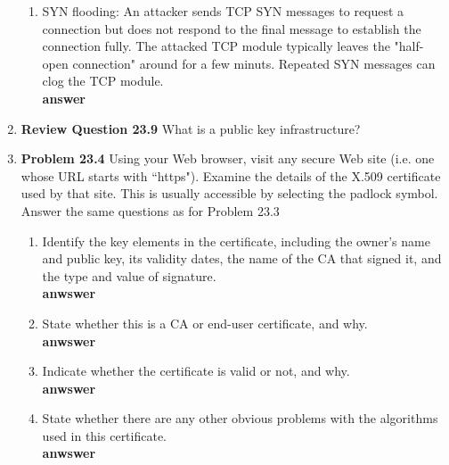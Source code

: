\documentclass[12pt]{article}
\begin{document}
\begin{enumerate}
\begin{enumerate}
    \item SYN flooding: An attacker sends TCP SYN messages to request a connection but does not respond to the final message to establish the connection fully. The attacked TCP module typically leaves the "half-open connection" around for a few minuts. Repeated SYN messages can clog the TCP module.\\

    \textbf{answer} \\

  \end{enumerate}

  \item \textbf{Review Question 23.9} What is a public key infrastructure?\\

  \item \textbf{Problem 23.4} Using your Web browser, visit any secure Web site (i.e. one whose URL starts with ``https"). Examine the details of the X.509 certificate used by that site. This is usually accessible by selecting the padlock symbol. Answer the same questions as for Problem 23.3 \\

  \begin{enumerate}
    \item Identify the key elements in the certificate, including the owner's name and public key, its validity dates, the name of the CA that signed it, and the type and value of signature. \\

    \textbf{anwswer} \\

    \item State whether this is a CA or end-user certificate, and why. \\

    \textbf{anwswer} \\

    \item Indicate whether the certificate is valid or not, and why. \\

    \textbf{anwswer} \\

    \item State whether there are any other obvious problems with the algorithms used in this certificate. \\

    \textbf{anwswer} \\


\end{enumerate}
\end{enumerate}
\end{document}
